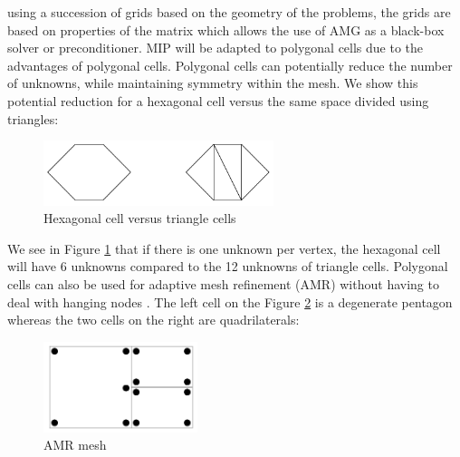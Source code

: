using a succession of grids based on the geometry of the problems, the grids
are based on properties of the matrix which allows the use of AMG as a black-box
solver or preconditioner. MIP will be adapted to polygonal cells due to the
advantages of polygonal cells. Polygonal cells can 
potentially reduce the number of unknowns, while maintaining symmetry 
within the mesh. We show this potential reduction for a hexagonal cell versus 
the same space divided using triangles:
\begin{figure}[H]
\centering
\includegraphics[width=0.6\textwidth]{./Introduction/hex_tri_cells}
\caption{Hexagonal cell versus triangle cells}
\label{fig_hex_tri}
\end{figure}
We see in Figure \ref{fig_hex_tri} that if there is one unknown per vertex, 
the hexagonal cell will have 6
unknowns compared to the 12 unknowns of triangle cells. Polygonal cells can
also be used for adaptive mesh refinement (AMR) without having to
deal with hanging nodes 
\cite{locally_hanging_nodes,arbitrary_hanging_nodes,dealII_hanging_nodes}. The 
left cell on the Figure \ref{fig_amr_mesh} is a degenerate pentagon whereas 
the two cells on the right are quadrilaterals:
\begin{figure}[H]
\centering
\includegraphics[width=0.4\textwidth]{./Introduction/amr}
\caption{AMR mesh}
\label{fig_amr_mesh}
\end{figure}

